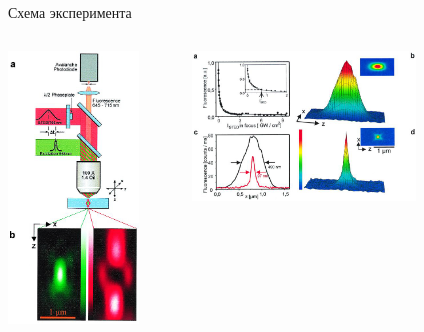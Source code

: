 \documentclass[9pt, compress, xcolor=table]{beamer}
\begin{document}
\begin{frame}{Схема эксперимента}
\begin{columns}[c] \column{4cm}
\begin{center}
\includegraphics[width=0.8\textwidth]{fig4_07b}
\end{center}
\column{8cm}
\begin{center}
\includegraphics[width=0.7\textwidth]{fig4_07a}


\end{center}
\end{columns}
\end{frame}
\end{document}
